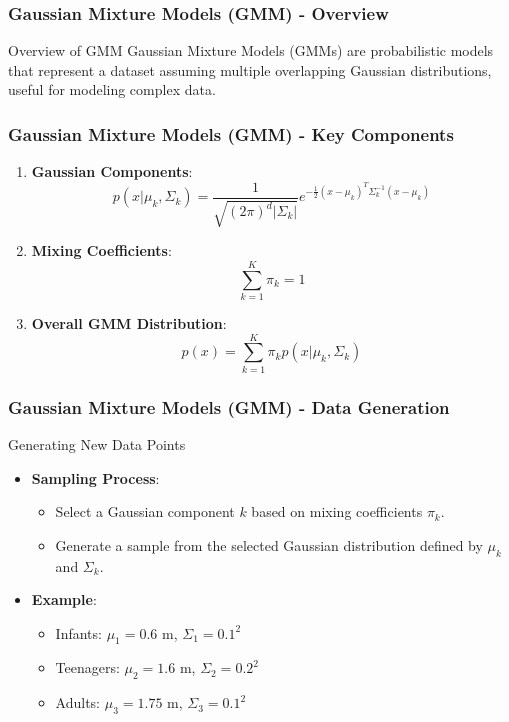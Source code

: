 \documentclass[aspectratio=169]{beamer}
\begin{document}
\begin{frame}[fragile]
    \frametitle{Gaussian Mixture Models (GMM) - Overview}
    \begin{block}{Overview of GMM}
        Gaussian Mixture Models (GMMs) are probabilistic models that represent a dataset assuming multiple overlapping Gaussian distributions, useful for modeling complex data. 
    \end{block}
\end{frame}

\begin{frame}[fragile]
    \frametitle{Gaussian Mixture Models (GMM) - Key Components}
    \begin{enumerate}
        \item \textbf{Gaussian Components}: 
        \begin{equation}
            p(x | \mu_k, \Sigma_k) = \frac{1}{\sqrt{(2\pi)^d |\Sigma_k|}} e^{-\frac{1}{2} (x - \mu_k)^T \Sigma_k^{-1} (x - \mu_k)}
        \end{equation}
        \item \textbf{Mixing Coefficients}: 
        \begin{equation}
            \sum_{k=1}^K \pi_k = 1
        \end{equation}
        \item \textbf{Overall GMM Distribution}:
        \begin{equation}
            p(x) = \sum_{k=1}^K \pi_k p(x | \mu_k, \Sigma_k)
        \end{equation}
    \end{enumerate}
\end{frame}

\begin{frame}[fragile]
    \frametitle{Gaussian Mixture Models (GMM) - Data Generation}
    \begin{block}{Generating New Data Points}
        \begin{itemize}
            \item \textbf{Sampling Process}:
            \begin{itemize}
                \item Select a Gaussian component \( k \) based on mixing coefficients \( \pi_k \).
                \item Generate a sample from the selected Gaussian distribution defined by \( \mu_k \) and \( \Sigma_k \).
            \end{itemize}
            \item \textbf{Example}:
            \begin{itemize}
                \item Infants: \( \mu_1 = 0.6 \) m, \( \Sigma_1 = 0.1^2 \)
                \item Teenagers: \( \mu_2 = 1.6 \) m, \( \Sigma_2 = 0.2^2 \)
                \item Adults: \( \mu_3 = 1.75 \) m, \( \Sigma_3 = 0.1^2 \)
            \end{itemize}
        \end{itemize}
    \end{block}
\end{frame}
\end{document}
